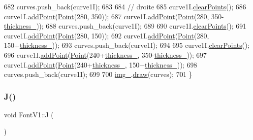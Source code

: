 \begin{DoxyCode}
682     curves.push\_back(curve1I);
683 
684     \textcolor{comment}{// droite}
685     curve1I.\mbox{\hyperlink{class_bezier_curve_a0ba8ce66d5af5971ae6a1b506029728e}{clearPoints}}();
686     curve1I.\mbox{\hyperlink{class_bezier_curve_a38d16c18b36ae45619b05e26e226cf34}{addPoint}}(\mbox{\hyperlink{class_point}{Point}}(280, 350));
687     curve1I.\mbox{\hyperlink{class_bezier_curve_a38d16c18b36ae45619b05e26e226cf34}{addPoint}}(\mbox{\hyperlink{class_point}{Point}}(280, 350-\mbox{\hyperlink{class_font_v1_aed8040e76be9a52833627b92f0fb4e5f}{thickness\_}}));
688     curves.push\_back(curve1I);
689 
690     curve1I.\mbox{\hyperlink{class_bezier_curve_a0ba8ce66d5af5971ae6a1b506029728e}{clearPoints}}();
691     curve1I.\mbox{\hyperlink{class_bezier_curve_a38d16c18b36ae45619b05e26e226cf34}{addPoint}}(\mbox{\hyperlink{class_point}{Point}}(280, 150));
692     curve1I.\mbox{\hyperlink{class_bezier_curve_a38d16c18b36ae45619b05e26e226cf34}{addPoint}}(\mbox{\hyperlink{class_point}{Point}}(280, 150+\mbox{\hyperlink{class_font_v1_aed8040e76be9a52833627b92f0fb4e5f}{thickness\_}}));
693     curves.push\_back(curve1I);
694 
695     curve1I.\mbox{\hyperlink{class_bezier_curve_a0ba8ce66d5af5971ae6a1b506029728e}{clearPoints}}();
696     curve1I.\mbox{\hyperlink{class_bezier_curve_a38d16c18b36ae45619b05e26e226cf34}{addPoint}}(\mbox{\hyperlink{class_point}{Point}}(240+\mbox{\hyperlink{class_font_v1_aed8040e76be9a52833627b92f0fb4e5f}{thickness\_}}, 350-\mbox{\hyperlink{class_font_v1_aed8040e76be9a52833627b92f0fb4e5f}{thickness\_}}));
697     curve1I.\mbox{\hyperlink{class_bezier_curve_a38d16c18b36ae45619b05e26e226cf34}{addPoint}}(\mbox{\hyperlink{class_point}{Point}}(240+\mbox{\hyperlink{class_font_v1_aed8040e76be9a52833627b92f0fb4e5f}{thickness\_}}, 150+\mbox{\hyperlink{class_font_v1_aed8040e76be9a52833627b92f0fb4e5f}{thickness\_}}));
698     curves.push\_back(curve1I);
699 
700     \mbox{\hyperlink{class_font_v1_a00569e3e3c4b70f437b63f396f735fb0}{img\_}}.\mbox{\hyperlink{class_image_a8d162f3cab956131d58708c09aa560b0}{draw}}(curves);
701 \}
\end{DoxyCode}
\mbox{\label{class_font_v1_a3fe315f13fd21c6dbd5f81113cd1c3f6}} 
\subsubsection{\texorpdfstring{J()}{J()}}
{\footnotesize\ttfamily void Font\+V1\+::J (\begin{DoxyParamCaption}{ }\end{DoxyParamCaption})}



